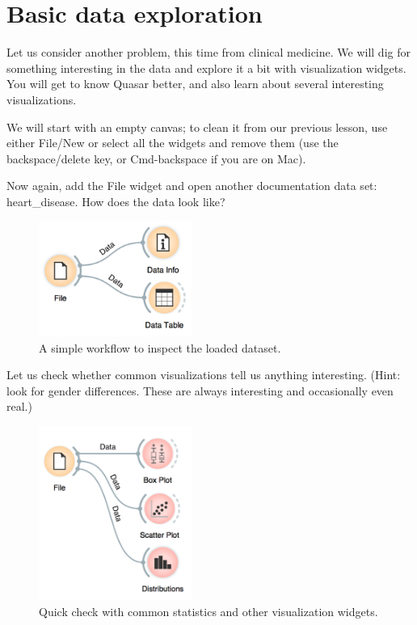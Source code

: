 \chapter{Basic data exploration}
\label{ch:basic_data_exploration}

 Let us consider another problem, this time from clinical medicine. We will dig for something interesting in the data and explore it a bit with visualization widgets. You will get to know Quasar better, and also learn about several interesting visualizations.

We will start with an empty canvas; to clean it from our previous lesson, use either File/New or select all the widgets and remove them (use the backspace/delete key, or Cmd-backspace if you are on Mac).

Now again, add the File widget and open another documentation data set: heart\_disease. How does the data look like?

\begin{figure}[h]
  \centering
  \includegraphics[width=50mm]{basic_data_exploration-fig1.png}%
  \caption{A simple workflow to inspect the loaded dataset.}
  \label{fig:basic_data_exploration-fig1}
\end{figure}

Let us check whether common visualizations tell us anything interesting. (Hint: look for gender differences. These are always interesting and occasionally even real.)

\begin{figure}[h]
  \centering
  \includegraphics[width=50mm]{basic_data_exploration-fig2.png}%
  \caption{Quick check with common statistics and other visualization widgets.}
  \label{fig:basic_data_exploration-fig2}
\end{figure}

